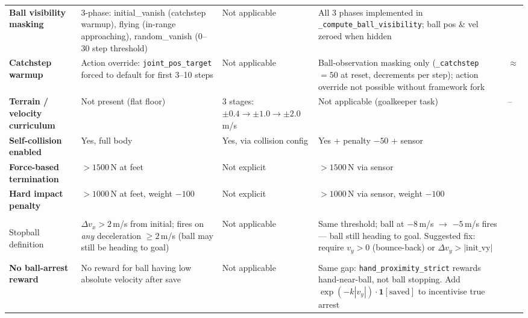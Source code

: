\documentclass[a4paper,10pt]{article}
\newcommand{\cmark}{\ding{51}}   %
\newcommand{\xmark}{\ding{55}}   %
\newcommand{\wmark}{$\approx$}   %
\begin{document}
{\begin{longtable}{>{\bfseries}p{3.6cm} p{3.4cm} p{3.4cm} p{3.4cm} p{1.2cm}}
Ball visibility masking
  & 3-phase: initial\_vanish (catchstep warmup), flying (in-range approaching), random\_vanish (0--30 step threshold)
  & Not applicable
  & All 3 phases implemented in \texttt{\_compute\_ball\_visibility}; ball pos \& vel zeroed when hidden
  & \cmark \\

Catchstep warmup
  & Action override: \texttt{joint\_pos\_target} forced to default for first 3--10 steps
  & Not applicable
  & Ball-observation masking only (\texttt{\_catchstep} $= 50$ at reset, decrements per step); action override not possible without framework fork
  & \wmark \\

Terrain / velocity curriculum
  & Not present (flat floor)
  & 3 stages: $\pm0.4\to\pm1.0\to\pm2.0$\,m/s
  & Not applicable (goalkeeper task)
  & -- \\

Self-collision enabled
  & Yes, full body
  & Yes, via collision config
  & Yes + penalty $-50$ + sensor
  & \cmark \\

Force-based termination
  & $>1500$\,N at feet
  & Not explicit
  & $>1500$\,N via sensor
  & \cmark \\

Hard impact penalty
  & $>1000$\,N at feet, weight $-100$
  & Not explicit
  & $>1000$\,N via sensor, weight $-100$
  & \cmark \\

\midrule
\rowcolor{sectionbg}
\multicolumn{5}{l}{\textcolor{white}{\textbf{Reward design limitations (design choices, not implementation gaps)}}} \\
\midrule

Stopball definition
  & $\Delta v_x > 2$\,m/s from initial; fires on \emph{any} deceleration $\geq 2$\,m/s (ball may still be heading to goal)
  & Not applicable
  & Same threshold; ball at $-8$\,m/s $\to$ $-5$\,m/s fires --- ball still heading to goal. Suggested fix: require $v_y > 0$ (bounce-back) or $\Delta v_y > |\text{init\_vy}|$
  & \xmark \\

No ball-arrest reward
  & No reward for ball having low absolute velocity after save
  & Not applicable
  & Same gap: \texttt{hand\_proximity\_strict} rewards hand-near-ball, not ball stopping. Add $\exp(-k|v_y|)\cdot\mathbf{1}[\text{saved}]$ to incentivise true arrest
  & \xmark \\


\end{longtable}}
\end{document}
